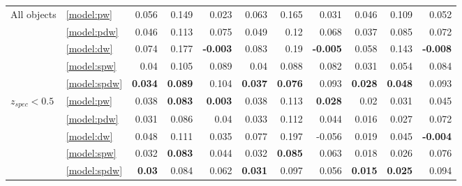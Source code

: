 \documentclass[fleqn,usenatbib]{mnras}
\begin{document}
\begin{table}
\begin{tabular}{llrrrrrrrrr}
\hline
            All objects       & \ref{model:pw} &                0.056 &           0.149 &            0.023 &            0.063 &           0.165 &            0.031 &            0.046 &           0.109 &            0.052 \\
                              & \ref{model:pdw} &                0.046 &           0.113 &            0.075 &            0.049 &            0.12 &            0.068 &            0.037 &           0.085 &            0.072 \\
                              & \ref{model:dw} &                0.074 &           0.177 &  \textbf{-0.003} &            0.083 &            0.19 &  \textbf{-0.005} &            0.058 &           0.143 &  \textbf{-0.008} \\
                              & \ref{model:spw} &                 0.04 &           0.105 &            0.089 &             0.04 &           0.088 &            0.082 &            0.031 &           0.054 &            0.084 \\
                              & \ref{model:spdw} &       \textbf{0.034} &  \textbf{0.089} &            0.104 &   \textbf{0.037} &  \textbf{0.076} &            0.093 &   \textbf{0.028} &  \textbf{0.048} &            0.093 \\
\hline
\hline
            $z_{spec} < 0.5$ & \ref{model:pw} &                0.038 &  \textbf{0.083} &   \textbf{0.003} &            0.038 &           0.113 &   \textbf{0.028} &             0.02 &           0.031 &            0.045 \\
                              & \ref{model:pdw} &                0.031 &           0.086 &             0.04 &            0.033 &           0.112 &            0.044 &            0.016 &           0.027 &            0.072 \\
                              & \ref{model:dw} &                0.048 &           0.111 &            0.035 &            0.077 &           0.197 &           -0.056 &            0.019 &           0.045 &  \textbf{-0.004} \\
                              & \ref{model:spw} &                0.032 &  \textbf{0.083} &            0.044 &            0.032 &  \textbf{0.085} &            0.063 &            0.018 &           0.026 &            0.076 \\
                              & \ref{model:spdw} &        \textbf{0.03} &           0.084 &            0.062 &   \textbf{0.031} &           0.097 &            0.056 &   \textbf{0.015} &  \textbf{0.025} &            0.094 \\

\end{tabular}
\end{table}
\end{document}

